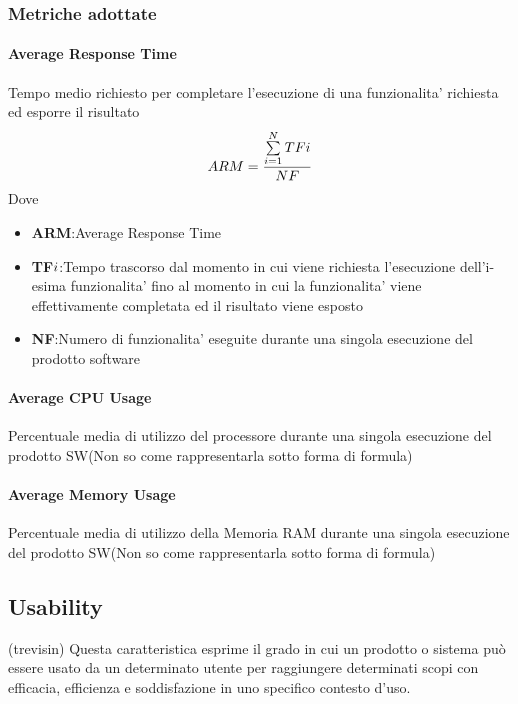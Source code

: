 \subsubsection{Metriche adottate}
\paragraph{Average Response Time}
Tempo medio richiesto per completare l'esecuzione di una funzionalita' richiesta ed esporre il risultato
$$ARM=\frac{\sum\limits_{i=1}^N TF{\small{i}}}{NF}$$
Dove
\begin{itemize}
\item{\textbf{ARM}}:Average Response Time
\item{\textbf{TF${\small{i}}$}}:Tempo trascorso dal momento in cui viene richiesta l'esecuzione dell'i-esima funzionalita' fino al momento in cui la funzionalita' viene effettivamente completata ed il risultato viene esposto
\item{\textbf{NF}}:Numero di funzionalita' eseguite durante una singola esecuzione del prodotto software
\end{itemize}
\paragraph{Average CPU Usage}
Percentuale media di utilizzo del processore durante una singola esecuzione del prodotto SW(Non so come rappresentarla sotto forma di formula)
\paragraph{Average Memory Usage}
Percentuale media di utilizzo della Memoria RAM durante una singola esecuzione del prodotto SW(Non so come rappresentarla sotto forma di formula)


\subsection{Usability} (trevisin)
Questa caratteristica esprime il grado in cui un prodotto o sistema può essere usato da un determinato utente per raggiungere determinati scopi con efficacia, efficienza e soddisfazione in uno specifico contesto d'uso.
